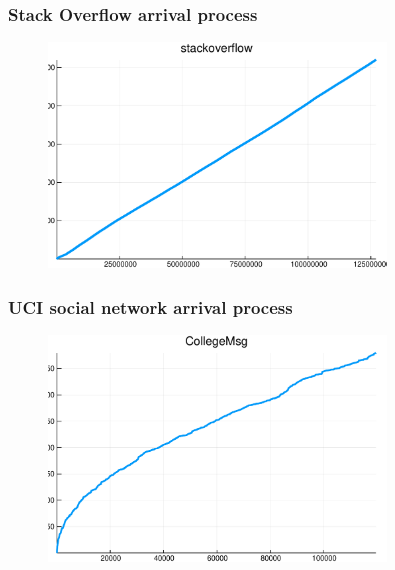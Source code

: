 \documentclass[final,hyperref={pdfpagelabels=false},noamsthm]{beamer}
\begin{document}
\begin{frame}
	\frametitle{Stack Overflow arrival process}
	\begin{figure}[h]
		\includegraphics[width=0.8\textwidth]{fig/arrival_times_stackoverflow.pdf}
	\end{figure}
	
\end{frame}

\begin{frame}
	\frametitle{UCI social network arrival process}
	\begin{figure}[h]
		\includegraphics[width=0.8\textwidth]{fig/arrival_times_CollegeMsg.pdf}
	\end{figure}
	
\end{frame}
\end{document}
